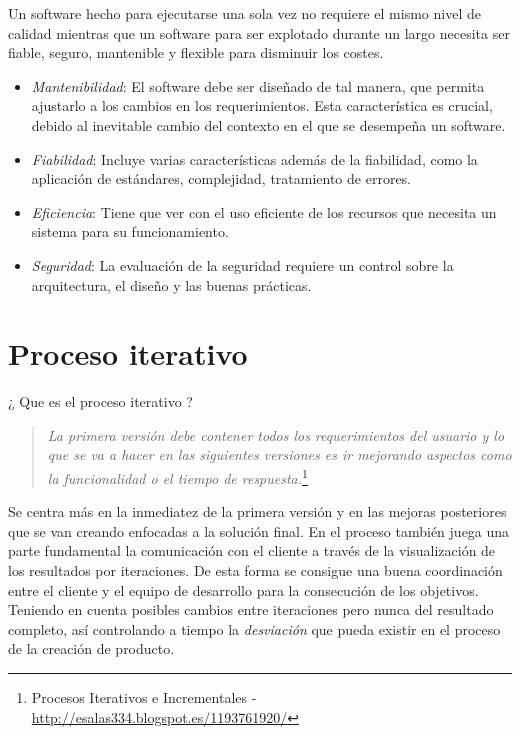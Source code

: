 \par Un software hecho para ejecutarse una sola vez no requiere el mismo nivel de calidad mientras que un software para ser explotado durante un largo necesita ser fiable, seguro, mantenible y flexible para disminuir los costes.

\begin{itemize}
	\item \emph{Mantenibilidad}: El software debe ser diseñado de tal manera, que permita ajustarlo a los cambios en los requerimientos. Esta característica es crucial, debido al inevitable cambio del contexto en el que se desempeña un software.
	\item \emph{Fiabilidad}: Incluye varias características además de la fiabilidad, como la aplicación de estándares, complejidad, tratamiento de errores.
	\item \emph{Eficiencia}: Tiene que ver con el uso eficiente de los recursos que necesita un sistema para su funcionamiento.
	\item \emph{Seguridad}: La evaluación de la seguridad requiere un control sobre la arquitectura, el diseño y las buenas prácticas.
\end{itemize}


\section{Proceso iterativo}
\label{sec:proc-iterativo}

\par ¿ Que es el proceso iterativo ?

\begin{quote}
    \emph{La primera versión debe contener todos los requerimientos del usuario y lo que se va a hacer en las siguientes versiones es ir mejorando aspectos como la funcionalidad o el tiempo de respuesta.}\footnote{Procesos Iterativos e Incrementales - \url{http://esalas334.blogspot.es/1193761920/}}
\end{quote}

\par Se centra más en la inmediatez de la primera versión y en las mejoras posteriores que se van creando enfocadas a la solución final. En el proceso también juega una parte fundamental la comunicación con el cliente a través de la visualización de los resultados por iteraciones. De esta forma se consigue una buena coordinación entre el cliente y el equipo de desarrollo para la consecución de los objetivos. Teniendo en cuenta posibles cambios entre iteraciones pero nunca del resultado completo, así controlando a tiempo la \emph{desviación} que pueda existir en el proceso de la creación de producto.

